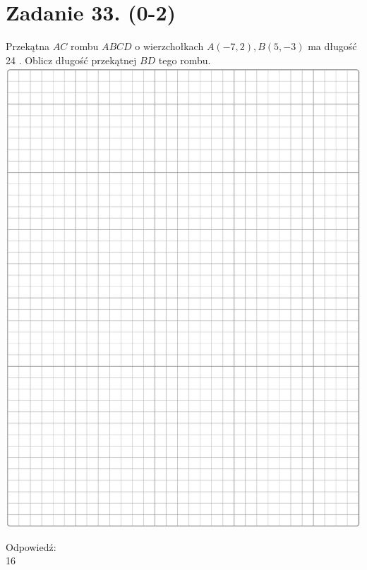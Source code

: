 \documentclass[10pt]{article}
\begin{document}
\section*{Zadanie 33. (0-2)}
Przekątna \(A C\) rombu \(A B C D\) o wierzchołkach \(A(-7,2), B(5,-3)\) ma długość 24 . Oblicz długość przekątnej \(B D\) tego rombu.\\
\includegraphics[max width=\textwidth, center]{2024_11_21_cdea326d19d0c2132b88g-16}

Odpowiedź: \(\qquad\)\\
16
\end{document}
